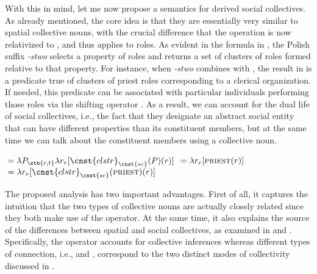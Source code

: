 \documentclass[output=paper]{langscibook}
\begin{document}
\noindent With this in mind, let me now propose a semantics for derived social collectives. As already mentioned, the core idea is that they are essentially very similar to spatial collective nouns, with the crucial difference that the  operation is now relativized to , and thus applies to roles. As evident in the formula in , the Polish suffix \textit{-stwo} selects a property of roles and returns a set of clusters of roles formed relative to that property. For instance, when \textit{-stwo} combines with , the result in  is a predicate true of clusters of priest roles corresponding to a clerical organization. If needed, this predicate can be associated with particular individuals performing those roles via the shifting operator . As a result, we can account for the dual life of social collectives, i.e., the fact that they designate an abstract social entity that can have different properties than its constituent members, but at the same time we can talk about the constituent members using a collective noun.  

\ea \ea {}${ } =\lambda P_{\stb{r,t}} \lambda r_r[\cnst{clstr}_{\cnst{sc}}(P)(r)]$\label{wan:form:stwo}
\ex {}${ } =\lambda r_r[\textsc{priest}(r)]$\label{wan:form:duchowny}
\ex {}${ } =\lambda r_r[\cnst{clstr}_{\cnst{sc}}(\textsc{priest})(r)]$\label{wan:form:social-cluster}
\z
\z

\noindent The proposed analysis has two important advantages. First of all, it captures the intuition that the two types of collective nouns are actually closely related since they both make use of the  operator. At the same time, it also explains the source of the differences between spatial and social collectives, as examined in  and . Specifically, the  operator accounts for collective inferences whereas different types of connection, i.e.,  and , correspond to the two distinct modes of collectivity discussed in .
\end{document}
